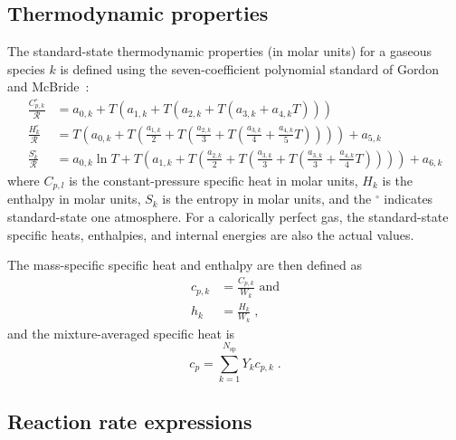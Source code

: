 \documentclass[preprint,12pt]{elsarticle}
\begin{document}
\subsection{Thermodynamic properties}

The standard-state thermodynamic properties (in molar units) for a gaseous species $k$ is defined using the seven-coefficient polynomial standard of Gordon and McBride~\cite{Gordon:1976wp}:
\begin{align}
\frac{C_{p,k}^{\circ}}{\mathcal{R}} &= a_{0,k} + T \left( a_{1,k} + T \left( a_{2,k} + T \left( a_{3,k} + a_{4,k} T \right) \right) \right) \label{e:cpk} \\
\frac{H_k^{\circ}}{\mathcal{R}} &= T \left( a_{0,k} + T \left( \frac{a_{1,k}}{2} + T \left( \frac{a_{2,k}}{3} + T \left( \frac{a_{3,k}}{4} + \frac{a_{4,k}}{5} T \right) \right) \right) \right) + a_{5,k} \label{e:hk} \\
\frac{S_k^{\circ}}{\mathcal{R}} &= a_{0,k} \ln T + T \left( a_{1,k} + T \left( \frac{a_{2,k}}{2} + T \left( \frac{a_{3,k}}{3} + T \left( \frac{a_{3,k}}{3} + \frac{a_{4,k}}{4} T \right) \right) \right) \right) + a_{6,k} \label{e:sk}
\end{align}
where $C_{p,l}$ is the constant-pressure specific heat in molar units, $H_k$ is the enthalpy in molar units, $S_k$ is the entropy in molar units, and the ${}^{\circ}$ indicates standard-state one atmosphere.
For a calorically perfect gas, the standard-state specific heats, enthalpies, and internal energies are also the actual values.

The mass-specific specific heat and enthalpy are then defined as
\begin{align}
c_{p,k} &= \frac{C_{p,k}}{W_k} \text{ and} \\
h_k &= \frac{H_k}{W_k} \;,
\end{align}
and the mixture-averaged specific heat is
\begin{equation}
c_p = \sum_{k=1}^{N_{\text{sp}}} Y_k c_{p,k} \;.
\end{equation}

\subsection{Reaction rate expressions}
\end{document}
